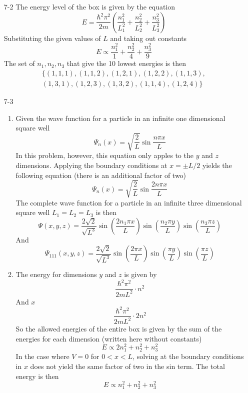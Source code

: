 \documentclass[]{2620hw}
\begin{document}
\maketitle	

\begin{enumerate}

\item [7-2]
The energy level of the box is given by the equation
\[
	E = \frac{\hbar^2 \pi^2}{2m} \left( \frac{n_1^2}{L_1^2} + \frac{n_2^2}{L_2^2} + \frac{n_3^2}{L_3^2} \right)
\]
Substituting the given values of $L$ and  taking out constants
\[
	E \propto \frac{n_1^2}{1} + \frac{n_2^2}{4} + \frac{n_3^2}{9}
\]
The set of $n_1, n_2, n_3$ that give the 10 lowest energies is then
\begin{multline*}
	\{ (1,1,1), (1,1,2), (1,2,1), (1, 2, 2), (1, 1, 3),\\ (1, 3, 1), (1, 2, 3), (1, 3, 2), (1, 1, 4), (1, 2,4) \} 
\end{multline*}

\item [7-3]
\begin{enumerate}
	\item
	Given the wave function for a particle in an infinite one dimensional square well
	\[
		\Psi_n(x)  = \sqrt{ \frac{2}{L} } \sin \frac{n \pi x}{L} 
	\]
	In this problem, however, this equation only apples to the $y$ and $z$ dimensions.
	Applying the boundary conditions at $x =\pm L/2$ yields the following equation (there is an additional factor of two)
	\[
		\Psi_n(x)  = \sqrt{ \frac{2}{L} } \sin \frac{2 n \pi x}{L}
	\]
	The complete wave function for a particle in an infinite three dimensional square well $L_1 = L_2 = L_3$ is then
	\[
		\Psi(x, y, z) = \frac{2 \sqrt{2}}{\sqrt{L^3}} \sin \left( \frac{2 n_1 \pi x }{L} \right) \sin \left( \frac{n_2 \pi y }{L} \right) \sin \left( \frac{n_3 \pi z }{L} \right)
	\]
	And 
	\[
		\Psi_{111}(x, y, z) = \frac{ 2 \sqrt{2}}{\sqrt{L^3}} \sin \left( \frac{2 \pi x }{L} \right) \sin \left( \frac{\pi y }{L} \right) \sin \left( \frac{\pi z }{L} \right)
	\]
	\item
	The energy for dimensions $y$ and $z$ is given by 
	\[
		\frac{\hbar^2 \pi^2}{2mL^2} \cdot n^2
	\]
	And $x$
	\[
		\frac{\hbar^2 \pi^2}{2mL^2} \cdot 2 n^2
	\]
	So the allowed energies of the entire box is given by the sum of the energies for each dimension (written here without constants)
	\[
		E \propto 2 n_1^2 + n_2^2 + n_3^2 
	\]
	In the case where $V=0$ for $0 < x < L$, solving at the boundary conditions in $x$ does not yield the same factor of two in the sin term. The total energy is then
	\[
		E \propto n_1^2 + n_2^2 + n_3^2 
	\]


\end{enumerate}
\end{enumerate}
\end{document}
